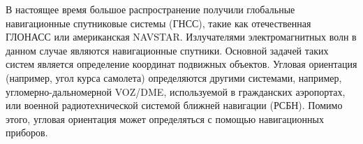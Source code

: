 \documentclass[../main.tex]{subfiles}
\begin{document}
В настоящее время большое распространение получили глобальные навигационные спутниковые системы (ГНСС), такие как отечественная ГЛОНАСС или американская NAVSTAR. Излучателями электромагнитных волн в данном случае являются навигационные спутники. Основной задачей таких систем является определение координат подвижных объектов. Угловая ориентация (например, угол курса самолета) определяются другими системами, например, угломерно-дальномерной VOZ/DME, используемой в гражданских аэропортах, или военной радиотехнической системой ближней навигации (РСБН). Помимо этого, угловая ориентация может определяться с помощью навигационных приборов.
\end{document}
